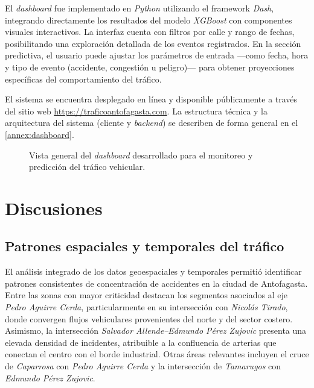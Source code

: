 \documentclass[12pt]{article}
\begin{document}
El \textit{dashboard} fue implementado en \textit{Python} utilizando el framework \textit{Dash}, integrando directamente los resultados del modelo \textit{XGBoost} con componentes visuales interactivos. La interfaz cuenta con filtros por calle y rango de fechas, posibilitando una exploración detallada de los eventos registrados. En la sección predictiva, el usuario puede ajustar los parámetros de entrada —como fecha, hora y tipo de evento (accidente, congestión u peligro)— para obtener proyecciones específicas del comportamiento del tráfico.

El sistema se encuentra desplegado en línea y disponible públicamente a través del sitio web \url{https://traficoantofagasta.com}. La estructura técnica y la arquitectura del sistema (cliente y \textit{backend}) se describen de forma general en el \autoref{annex:dashboard}.

\begin{figure}[H]
    \centering
    \hfill
    \caption{Vista general del \textit{dashboard} desarrollado para el monitoreo y predicción del tráfico vehicular.}
    \label{fig:dashboard_general}
\end{figure}

\section{Discusiones}

\subsection{Patrones espaciales y temporales del tráfico}

El análisis integrado de los datos geoespaciales y temporales permitió identificar patrones consistentes de concentración de accidentes en la ciudad de Antofagasta. Entre las zonas con mayor criticidad destacan los segmentos asociados al eje \textit{Pedro Aguirre Cerda}, particularmente en su intersección con \textit{Nicolás Tirado}, donde convergen flujos vehiculares provenientes del norte y del sector costero. Asimismo, la intersección \textit{Salvador Allende–Edmundo Pérez Zujovic} presenta una elevada densidad de incidentes, atribuible a la confluencia de arterias que conectan el centro con el borde industrial. Otras áreas relevantes incluyen el cruce de \textit{Caparrosa} con \textit{Pedro Aguirre Cerda} y la intersección de \textit{Tamarugos} con \textit{Edmundo Pérez Zujovic}.
\end{document}

